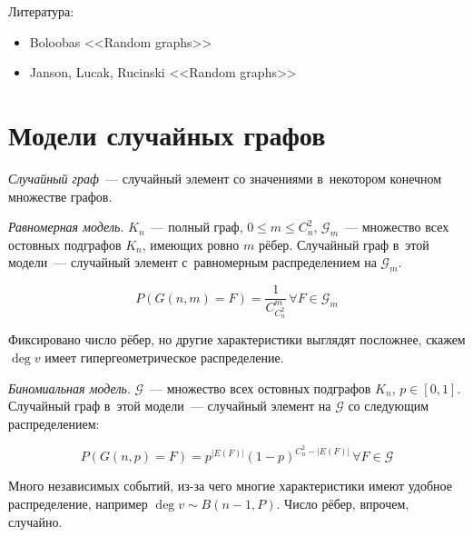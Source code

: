 \documentclass{article}
\begin{document}
Литература:
\begin{itemize}
	\item Boloobas <<Random graphs>>
	\item Janson, Lucak, Rucinski <<Random graphs>>
\end{itemize}

\section{Модели случайных графов}

\begin{definition}
	\emph{Случайный граф}~--- случайный элемент со значениями в~некотором конечном
	множестве графов.
\end{definition}

\begin{definition}
	\emph{Равномерная модель}. $K_n$~--- полный граф, $0 \le m \le C_n^2$,
	$\mathcal{G}_m$~--- множество всех остовных подграфов $K_n$, имеющих ровно $m$
	рёбер. Случайный граф в~этой модели~--- случайный элемент с~равномерным
	распределением на $\mathcal{G}_m$.

	$$ P(G(n, m) = F) = \frac{1}{C_{C_n^2}^m} \,\forall F \in \mathcal{G}_m $$
\end{definition}

Фиксировано число рёбер, но другие характеристики выглядят посложнее, скажем
$\deg v$ имеет гипергеометрическое распределение.

\begin{definition}
	\emph{Биномиальная модель}. $\mathcal{G}$~--- множество всех остовных
	подграфов $K_n$, $p \in [0, 1]$. Случайный граф в~этой модели~--- случайный
	элемент на $\mathcal{G}$ со следующим распределением:

	$$ P(G(n, p) = F) = p^{|E(F)|} (1 - p)^{C_n^2 - |E(F)|} \, \forall F \in
	\mathcal{G}$$
\end{definition}

Много независимых событий, из-за чего многие характеристики имеют удобное
распределение, например $\deg v \sim B(n - 1, P)$. Число рёбер, впрочем,
случайно.
\end{document}
